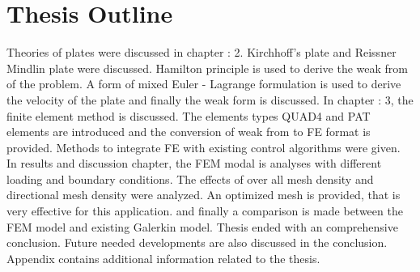 \documentclass[main.tex]{subfiles}
\begin{document}

 

\section{Thesis Outline}
Theories of plates were discussed in chapter : 2. Kirchhoff's plate and Reissner Mindlin plate were discussed. Hamilton principle is used to derive the weak from of the problem. A form of mixed Euler - Lagrange formulation is used to derive the velocity of the plate and finally the weak form is discussed. In chapter : 3, the finite element method is discussed. The elements types QUAD4 and PAT elements are introduced and the conversion of weak from to FE format is provided. Methods to integrate FE with existing control algorithms were given. In results and discussion chapter, the FEM modal is analyses with different loading and boundary conditions. The effects of over all mesh density and directional mesh density were analyzed. An optimized mesh is provided, that is very effective for this application. and finally a comparison is made between the FEM model and existing Galerkin model. Thesis ended with an comprehensive conclusion. Future needed developments are also discussed in the conclusion. Appendix contains additional information related to the thesis. 
\end{document}
